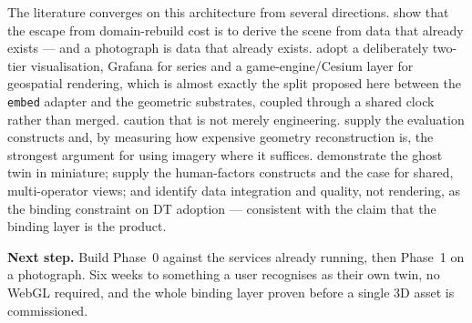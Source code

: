 The literature converges on this architecture from several directions.
\citet{rundel2023leveraging} show that the escape from domain-rebuild cost is to derive
the scene from data that already exists --- and a photograph is data that already exists.
\citet{vasilijevic2024trondheim} adopt a deliberately two-tier visualisation, Grafana for
series and a game-engine/Cesium layer for geospatial rendering, which is almost exactly
the split proposed here between the \texttt{embed} adapter and the geometric substrates,
coupled through a shared clock rather than merged. \citet{ali2024spatial} caution that
 is not merely engineering. \citet{mobilitydt2023} supply the evaluation
constructs and, by measuring how expensive geometry reconstruction is, the strongest
argument for using imagery where it suffices. \citet{liao2025digital} demonstrate the
ghost twin in miniature; \citet{chen2024tangible} supply the human-factors constructs and
the case for shared, multi-operator views; and \citet{yang2024digital} identify data
integration and quality, not rendering, as the binding constraint on DT adoption ---
consistent with the claim that the binding layer is the product.

\medskip
\noindent\textbf{Next step.} Build Phase~0 against the services already running, then
Phase~1 on a photograph. Six weeks to something a user recognises as their own twin, no
WebGL required, and the whole binding layer proven before a single 3D asset is
commissioned.
